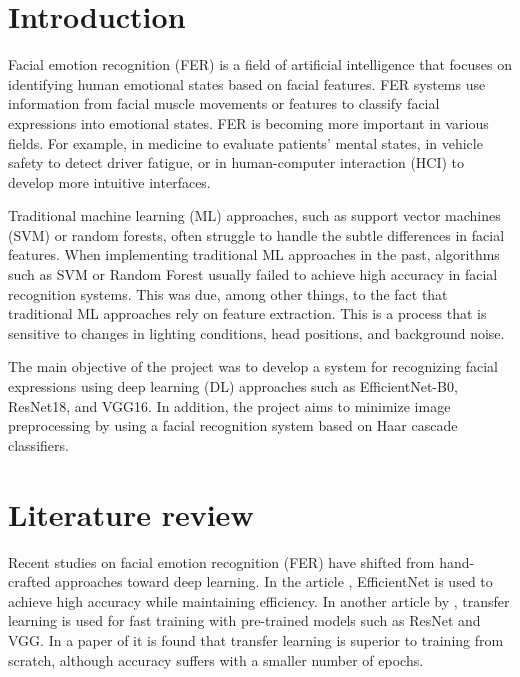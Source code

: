 \chapter{Introduction}

 
Facial emotion recognition (FER) is a field of artificial intelligence that focuses on identifying human emotional states based on facial features. FER systems use information from facial muscle movements or features to classify facial expressions into emotional states. FER is becoming more important in various fields. For example, in medicine to evaluate patients’ mental states, in vehicle safety to detect driver fatigue, or in human-computer interaction (HCI) to develop more intuitive interfaces.                

Traditional machine learning (ML) approaches, such as support vector machines (SVM) or random forests, often struggle to handle the subtle differences in facial features. When implementing traditional ML approaches in the past, algorithms such as SVM or Random Forest usually failed to achieve high accuracy in facial recognition systems. This was due, among other things, to the fact that traditional ML approaches rely on feature extraction. This is a process that is sensitive to changes in lighting conditions, head positions, and background noise.

The main objective of the project was to develop a system for recognizing facial expressions using deep learning (DL) approaches such as EfficientNet-B0, ResNet18, and VGG16. In addition, the project aims to minimize image preprocessing by using a facial recognition system based on Haar cascade classifiers.
\newline

\chapter{Literature review}

Recent studies on facial emotion recognition (FER) have shifted from hand-crafted approaches toward deep learning. In the article \citep{Sankaradass2024}, EfficientNet is used to achieve high accuracy while maintaining efficiency. In another article by \citep{Akhand2021}, transfer learning is used for fast training with pre-trained models such as ResNet and VGG. In a paper of \citep{DeepaPaikar2023} it is found that transfer learning is superior to training from scratch, although accuracy suffers with a smaller number of epochs.

